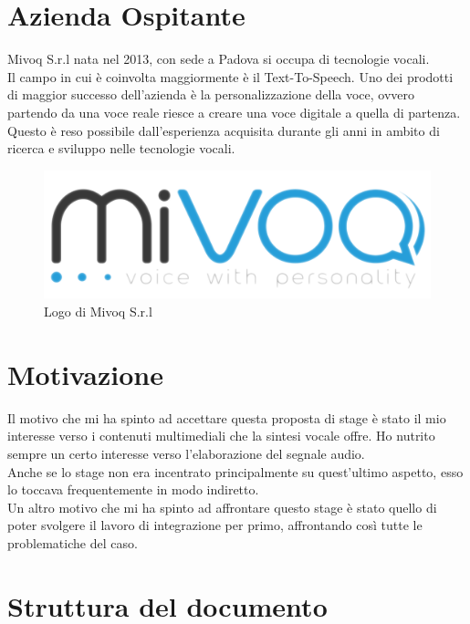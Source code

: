 \section{Azienda Ospitante}
Mivoq S.r.l nata nel 2013, con sede a Padova si occupa di tecnologie vocali.\\
Il campo in cui è coinvolta maggiormente è il Text-To-Speech. Uno dei prodotti di maggior successo dell'azienda è la personalizzazione della voce, ovvero partendo da una voce reale riesce a creare una voce digitale a quella di partenza.\\
Questo è reso possibile dall'esperienza acquisita durante gli anni in ambito di ricerca e sviluppo nelle tecnologie vocali.
\begin{figure}[H]
\centering
\includegraphics{images/logo-mivoq.png}
\caption{Logo di Mivoq S.r.l}
\end{figure}

\section{Motivazione}
Il motivo che mi ha spinto ad accettare questa proposta di stage è stato il mio interesse verso i contenuti multimediali che la sintesi vocale offre.
Ho nutrito sempre un certo interesse verso l'elaborazione del segnale audio.\\
Anche se lo stage non era incentrato principalmente su quest'ultimo aspetto, esso lo toccava frequentemente in modo indiretto.\\
Un altro motivo che mi ha spinto ad affrontare questo stage è stato quello di poter svolgere il lavoro di integrazione per primo, affrontando così tutte le problematiche del caso. 

\section{Struttura del documento}
 